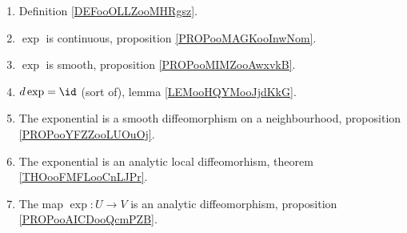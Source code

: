 
\begin{enumerate}
	\item
	      Definition \ref{DEFooOLLZooMHRgsz}.
      \item
          \( \exp\) is continuous, proposition \ref{PROPooMAGKooInwNom}.
      \item
          \( \exp\) is smooth, proposition \ref{PROPooMIMZooAwxvkB}.
      \item
          \( d\exp=\id\) (sort of), lemma \ref{LEMooHQYMooJjdKkG}.
	\item
	      The exponential is a smooth diffeomorphism on a neighbourhood, proposition \ref{PROPooYFZZooLUOuOj}.
	\item
	      The exponential is an analytic local diffeomorhism, theorem \ref{THOooFMFLooCnLJPr}.
	\item
	      The map \( \exp\colon U\to V\) is an analytic diffeomorphism, proposition \ref{PROPooAICDooQcmPZB}.
\end{enumerate}
